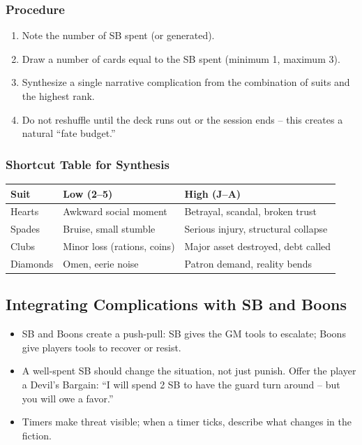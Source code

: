 \subsubsection{Procedure}
\begin{enumerate}
  \item Note the number of SB spent (or generated).
  \item Draw a number of cards equal to the SB spent (minimum 1, maximum 3).
  \item Synthesize a single narrative complication from the combination of suits and the highest rank.
  \item Do not reshuffle until the deck runs out or the session ends -- this creates a natural ``fate budget.''
\end{enumerate}

\subsubsection{Shortcut Table for Synthesis}
\begin{tabular}{@{}ll@{}}
\toprule
\textbf{Suit} & \textbf{Low (2--5)} & \textbf{High (J--A)} \\
\midrule
Hearts   & Awkward social moment & Betrayal, scandal, broken trust \\
Spades   & Bruise, small stumble & Serious injury, structural collapse \\
Clubs    & Minor loss (rations, coins) & Major asset destroyed, debt called \\
Diamonds & Omen, eerie noise & Patron demand, reality bends \\
\bottomrule
\end{tabular}

\subsection{Integrating Complications with SB and Boons}

\begin{itemize}
  \item SB and Boons create a push-pull: SB gives the GM tools to escalate; Boons give players tools to recover or resist.
  \item A well-spent SB should change the situation, not just punish. Offer the player a Devil's Bargain: ``I will spend 2 SB to have the guard turn around -- but you will owe a favor.''
  \item Timers make threat visible; when a timer ticks, describe what changes in the fiction.
\end{itemize}

